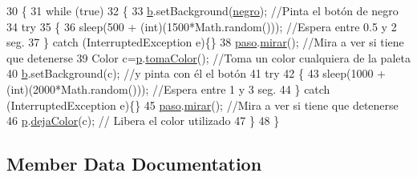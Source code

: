 \begin{DoxyCode}
30     \{
31         \textcolor{keywordflow}{while} (\textcolor{keyword}{true})
32         \{
33             \mbox{\hyperlink{class_ejemplo2_1_1_pintor_a6021262faf6f2f448fae53f631925af4}{b}}.setBackground(\mbox{\hyperlink{class_ejemplo2_1_1_pintor_a57bbfcbb65b0411c016704b96e9206d2}{negro}});             \textcolor{comment}{//Pinta el botón de negro}
34             \textcolor{keywordflow}{try}
35             \{
36                 sleep(500 + (\textcolor{keywordtype}{int})(1500*Math.random()));  \textcolor{comment}{//Espera entre 0.5 y 2 seg.}
37             \} \textcolor{keywordflow}{catch} (InterruptedException e)\{\}
38             \mbox{\hyperlink{class_ejemplo2_1_1_pintor_aa876f4590a419d58d81a29fcbf2a7529}{paso}}.\mbox{\hyperlink{class_ejemplo2_1_1_paso_a6d40a9340440e7b4fc7f19a35df68001}{mirar}}();              \textcolor{comment}{//Mira a ver si tiene que detenerse}
39             Color c=\mbox{\hyperlink{class_ejemplo2_1_1_pintor_af9c943ecf491a9a812b1df951af13bf3}{p}}.\mbox{\hyperlink{class_ejemplo2_1_1_paleta_a4b360ca77c1d02b9c06f5211effa22a0}{tomaColor}}();     \textcolor{comment}{//Toma un color cualquiera de la paleta}
40             \mbox{\hyperlink{class_ejemplo2_1_1_pintor_a6021262faf6f2f448fae53f631925af4}{b}}.setBackground(c);        \textcolor{comment}{//y pinta con él el botón}
41             \textcolor{keywordflow}{try}
42             \{
43                 sleep(1000 + (\textcolor{keywordtype}{int})(2000*Math.random()));  \textcolor{comment}{//Espera entre 1 y 3 seg.}
44             \} \textcolor{keywordflow}{catch} (InterruptedException e)\{\}
45             \mbox{\hyperlink{class_ejemplo2_1_1_pintor_aa876f4590a419d58d81a29fcbf2a7529}{paso}}.\mbox{\hyperlink{class_ejemplo2_1_1_paso_a6d40a9340440e7b4fc7f19a35df68001}{mirar}}();             \textcolor{comment}{//Mira a ver si tiene que detenerse}
46             \mbox{\hyperlink{class_ejemplo2_1_1_pintor_af9c943ecf491a9a812b1df951af13bf3}{p}}.\mbox{\hyperlink{class_ejemplo2_1_1_paleta_abe11e44a413ddff63a5758f67ace794b}{dejaColor}}(c);           \textcolor{comment}{// Libera el color utilizado}
47         \}
48     \}
\end{DoxyCode}


\subsection{Member Data Documentation}
\mbox{\label{class_ejemplo2_1_1_pintor_a6021262faf6f2f448fae53f631925af4}} 
